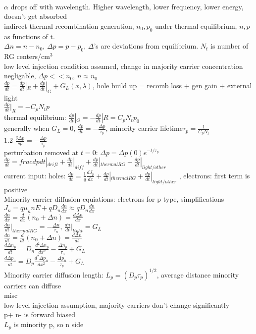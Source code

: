 \documentclass{article}
\begin{document}
\begin{large}
\\$\alpha$ drops off with wavelength. Higher wavelength, lower frequency, lower energy, doesn't get absorbed
\\indirect thermal recombination-generation, $n_0, p_0$ under thermal equilibrium, $n, p$ as functions of t.
\\$\Delta n=n-n_0$, $\Delta p=p-p_0$, $\Delta$'s are deviations from equilibrium. $N_t$ is number of RG centers/cm$^3$
\\low level injection condition assumed, change in majority carrier concentration negligable, $\Delta p<<n_0$, $n\approx n_0$
\\$\frac{dp}{dt}=\frac{dp}{dt}|_R+\frac{dp}{dt}|_G+G_L(x,\lambda)$, hole build up = recomb loss + gen gain + external light
\\$\frac{dp}{dt}|_R=-C_pN_tp$
\\thermal equilibrium: $\frac{dp}{dt}|_G=-\frac{dp}{dt}|R=C_pN_tp_0$
\\generally when $G_L=0$, $\frac{dp}{dt}=-\frac{\Delta p}{\tau_p}$, minority carrier lifetime$\tau_p=\frac{1}{C_pN_t}$
\\1.2 $\frac{\delta\Delta p}{\delta p}=-\frac{\Delta p}{\tau_p}$
\\perturbation removed at $t=0$: $\Delta p=\Delta p(0)e^{-t/\tau_p}$
\\$\frac{dp}{dt}=frac{dp}{dt}|_{drift}+\frac{dp}{dt}|_{diff}+\frac{dp}{dt}|_{thermal RG}+\frac{dp}{dt}|_{light/other}$
\\current input: holes: $\frac{dp}{dt}=\frac{1}{q}\frac{d J_p}{dx}+\frac{dp}{dt}|_{thermal RG}+\frac{dp}{dt}|_{light/other}$ , electrons: first term is positive
\\Minority carrier diffusion equiations:  electrons for p type, simplifications
\\$J_n=q\mu_nnE+qD_n\frac{dn}{dx}\approx qD_n\frac{dn}{dx}$
\\$\frac{dn}{dx}=\frac{d}{dx}(n_0+\Delta n)=\frac{d\Delta n}{dx}$
\\$\frac{dn}{dt}|_{thermal RG} = -\frac{\Delta n}{\tau_n}$,   $\frac{dn}{dt}|_{light}=G_L$
\\$\frac{dn}{dt}=\frac{d}{dt}(n_0+\Delta n)=\frac{d\Delta n}{dt}$
\\$\frac{d\Delta n_p}{dt}=D_n\frac{d^2\Delta n_p}{dx^2}-\frac{\Delta n_p}{\tau_n}+G_L$
\\$\frac{d\Delta p_n}{dt}=D_p\frac{d^2\Delta p_n}{dx^2}-\frac{\Delta p_n}{\tau_p}+G_L$
\\Minority carrier diffusion length: $L_p=(D_p\tau_p)^{1/2}$, average distance minority carriers can diffuse
\\misc
\\low level injection assumption, majority carriers don't change significantly
\\p+ n- is forward biased
\\$L_p$ is minority p, so n side
\end{large}
\end{document}
